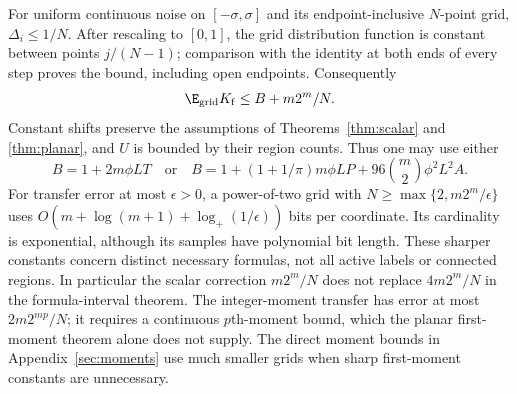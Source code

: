 For uniform continuous noise on $[-\sigma,\sigma]$ and its
endpoint-inclusive $N$-point grid, $\Delta_i\le1/N$. After rescaling to
$[0,1]$, the grid distribution function is constant between points
$j/(N-1)$; comparison with the identity at both ends of every step proves
the bound, including open endpoints. Consequently
\[
 \E_{\rm grid}K_{\rm f}\le B+m2^m/N.
\]
Constant shifts preserve the assumptions of Theorems~\ref{thm:scalar}
and \ref{thm:planar}, and $U$ is bounded by their region counts. Thus one
may use either
\[
 B=1+2m\phi LT
 \quad\text{or}\quad
 B=1+(1+1/\pi)m\phi LP+96\binom{m}{2}\phi^2L^2A.
\]
For transfer error at most $\epsilon>0$, a power-of-two grid with
$N\ge\max\{2,m2^m/\epsilon\}$ uses
$O(m+\log(m+1)+\log_+(1/\epsilon))$ bits per coordinate. Its cardinality
is exponential, although its samples have polynomial bit length.
These sharper constants concern distinct necessary formulas, not all active
labels or connected regions. In particular the scalar correction
$m2^m/N$ does not replace $4m2^m/N$ in the formula-interval theorem.
The integer-moment transfer has error at most $2m2^{mp}/N$; it requires
a continuous $p$th-moment bound, which the planar first-moment theorem
alone does not supply. The direct moment bounds in
Appendix~\ref{sec:moments} use much smaller grids when sharp first-moment
constants are unnecessary.
